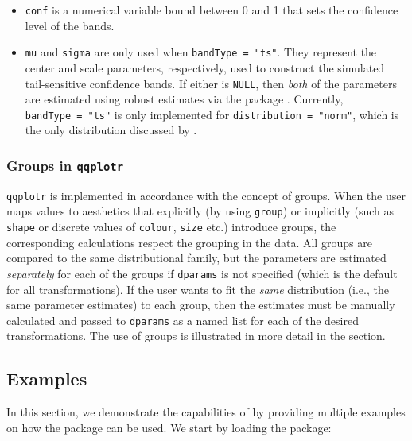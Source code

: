 \begin{itemize}
\item
  \texttt{conf} is a numerical variable bound between 0 and 1 that sets
  the confidence level of the bands.
\item
  \texttt{mu} and \texttt{sigma} are only used when
  \texttt{bandType\ =\ "ts"}. They represent the center and scale
  parameters, respectively, used to construct the simulated
  tail-sensitive confidence bands. If either is \texttt{NULL}, then
  \emph{both} of the parameters are estimated using robust estimates via
  the  package \citep{robustbase}. Currently,
  \texttt{bandType\ =\ "ts"} is only implemented for
  \texttt{distribution\ =\ "norm"}, which is the only distribution
  discussed by \citet{Aldor-Noiman2013-xw}.
\end{itemize}

\hypertarget{groups-in-qqplotr}{%
\subsubsection{\texorpdfstring{Groups in
\texttt{qqplotr}}{Groups in qqplotr}}\label{groups-in-qqplotr}}

\texttt{qqplotr} is implemented in accordance with the 
concept of groups. When the user maps values to aesthetics that
explicitly (by using \texttt{group}) or implicitly (such as
\texttt{shape} or discrete values of \texttt{colour}, \texttt{size}
etc.) introduce groups, the corresponding calculations respect the
grouping in the data. All groups are compared to the same distributional
family, but the parameters are estimated \emph{separately} for each of
the groups if \texttt{dparams} is not specified (which is the default
for all transformations). If the user wants to fit the \emph{same}
distribution (i.e., the same parameter estimates) to each group, then
the estimates must be manually calculated and passed to \texttt{dparams}
as a named list for each of the desired  transformations.
The use of groups is illustrated in more detail in the
 section.

\FloatBarrier

\hypertarget{examples}{%
\subsection{Examples}\label{examples}}

\label{sec:examples}

In this section, we demonstrate the capabilities of  by
providing multiple examples on how the package can be used. We start by
loading the package:

